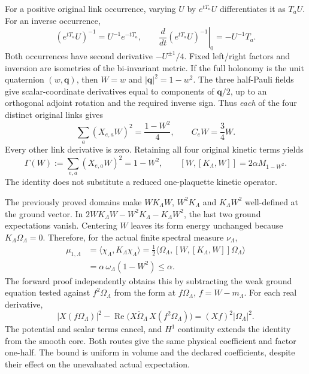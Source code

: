 For a positive original link occurrence, varying $U$ by $e^{tT_a}U$ differentiates it as $T_aU$. For an inverse occurrence,
\begin{equation}
 (e^{tT_a}U)^{-1}=U^{-1}e^{-tT_a},\qquad
 \left.\frac d{dt}(e^{tT_a}U)^{-1}\right|_{0}=-U^{-1}T_a.
 \label{eq:ak2-inverse}
\end{equation}
Both occurrences have second derivative $-U^{\pm1}/4$. Fixed left/right factors and inversion are isometries of the bi-invariant metric. If the full holonomy is the unit quaternion $(w,\mathbf q)$, then $W=w$ and $|\mathbf q|^2=1-w^2$. The three half-Pauli fields give scalar-coordinate derivatives equal to components of $\mathbf q/2$, up to an orthogonal adjoint rotation and the required inverse sign. Thus \emph{each} of the four distinct original links gives
\begin{equation}
 \sum_a(X_{e,a}W)^2=\frac{1-W^2}{4},\qquad C_eW=\frac34W.
\end{equation}
Every other link derivative is zero. Retaining all four original kinetic terms yields
\begin{equation}
 \Gamma(W):=\sum_{e,a}(X_{e,a}W)^2=1-W^2,
 \qquad[W,[K_\Lambda,W]]=2\alpha M_{1-W^2}.
 \label{eq:ak2-gradient}
\end{equation}
The identity does not substitute a reduced one-plaquette kinetic operator.

The previously proved domains make $WK_\Lambda W$, $W^2K_\Lambda$ and $K_\Lambda W^2$ well-defined at the ground vector. In $2WK_\Lambda W-W^2K_\Lambda-K_\Lambda W^2$, the last two ground expectations vanish. Centering $W$ leaves its form energy unchanged because $K_\Lambda\Omega_\Lambda=0$. Therefore, for the actual finite spectral measure $\nu_\Lambda$,
\begin{align}
 \mu_{1,\Lambda}
 &=\langle\chi_\Lambda,K_\Lambda\chi_\Lambda\rangle
 =\frac12\langle\Omega_\Lambda,[W,[K_\Lambda,W]]\Omega_\Lambda\rangle\\
 &=\alpha\,\omega_\Lambda(1-W^2)\le\alpha.
 \label{eq:ak2-finite-moment}
\end{align}
The forward proof independently obtains this by subtracting the weak ground equation tested against $f^2\Omega_\Lambda$ from the form at $f\Omega_\Lambda$, $f=W-m_\Lambda$. For each real derivative,
\begin{equation}
 |X(f\Omega_\Lambda)|^2-\operatorname{Re}
  \bigl(\overline{X\Omega_\Lambda}\,X(f^2\Omega_\Lambda)\bigr)
  =(Xf)^2|\Omega_\Lambda|^2.
\end{equation}
The potential and scalar terms cancel, and $H^1$ continuity extends the identity from the smooth core. Both routes give the same physical coefficient and factor one-half. The bound is uniform in volume and the declared coefficients, despite their effect on the unevaluated actual expectation.

